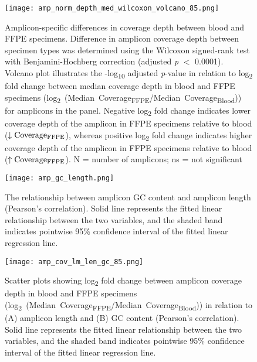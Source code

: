 \begin{figure}[H]
	\centering
	\texttt{[image: amp\_norm\_depth\_med\_wilcoxon\_volcano\_85.png]}
	\caption[Amplicon-specific differences in coverage depth between blood and FFPE specimens.]{Amplicon-specific differences in coverage depth between blood and FFPE specimens. Difference in amplicon coverage depth between specimen types was determined using the Wilcoxon signed-rank test with Benjamini-Hochberg correction (adjusted \textit{p} $<$ 0.0001). Volcano plot illustrates the -log\textsubscript{10} adjusted \textit{p}-value in relation to log\textsubscript{2} fold change between median coverage depth in blood and FFPE specimens (\mbox{log\textsubscript{2} (Median Coverage\textsubscript{FFPE}/Median Coverage\textsubscript{Blood})}) for amplicons in the panel. Negative log\textsubscript{2} fold change indicates lower coverage depth of the amplicon in FFPE specimens relative to blood ($\downarrow \text{Coverage\textsubscript{FFPE}}$), whereas positive log\textsubscript{2} fold change indicates higher coverage depth of the amplicon in FFPE specimens relative to blood ($\uparrow\text{Coverage\textsubscript{FFPE}}$). N = number of amplicons; ns = not significant}
	\label{fig:amp_norm_depth_med_wilcoxon_volcano}
\end{figure}


\begin{figure}[H]
	\centering
	\texttt{[image: amp\_gc\_length.png]}
	\caption[The relationship between amplicon GC content and amplicon length (Pearson's correlation).]{The relationship between amplicon GC content and amplicon length (Pearson's correlation). Solid line represents the fitted linear relationship between the two variables, and the shaded band indicates pointwise 95\% confidence interval of the fitted linear regression line.}
	\label{fig:amp_gc_length}
\end{figure}


\begin{figure}[H]
	\centering
	\texttt{[image: amp\_cov\_lm\_len\_gc\_85.png]}
	\caption[Scatter plots showing log\textsubscript{2} fold change between amplicon coverage depth in blood and FFPE specimens in relation to (A) amplicon length and (B) GC content (Pearson's correlation).]{Scatter plots showing log\textsubscript{2} fold change between amplicon coverage depth in blood and FFPE specimens (\mbox{log\textsubscript{2} (Median Coverage\textsubscript{FFPE}/Median Coverage\textsubscript{Blood})}) in relation to (A) amplicon length and (B) GC content (Pearson's correlation). Solid line represents the fitted linear relationship between the two variables, and the shaded band indicates pointwise 95\% confidence interval of the fitted linear regression line.}
	\label{fig:amp_cov_lm_len_gc}
\end{figure}

